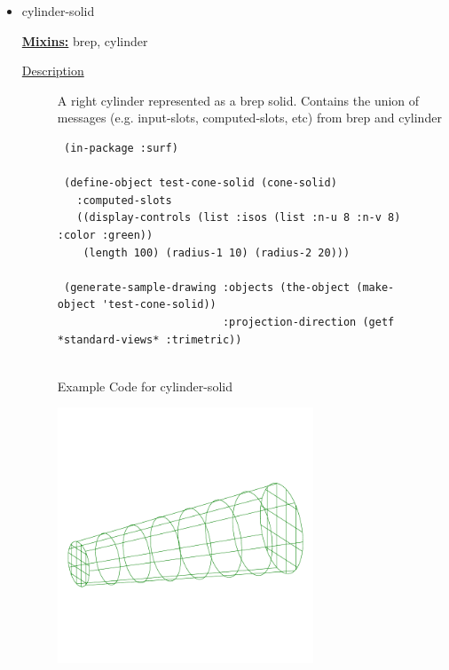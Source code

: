 \documentclass [11pt]{book}
\begin{document}
\begin{itemize}
\item {}cylinder-solid


\textbf{
\underline{Mixins:}} brep, cylinder





\begin{description}

\item [
\underline{Description}]


A right cylinder represented as a brep solid. Contains the union of messages (e.g. input-slots, computed-slots, etc)
from brep and cylinder



\end{description}




\begin{figure}
\begin{lrbox}{\boxedverb}
\begin{minipage}{\linewidth}
{\small

\begin{verbatim}
 (in-package :surf)

 (define-object test-cone-solid (cone-solid)
   :computed-slots
   ((display-controls (list :isos (list :n-u 8 :n-v 8) :color :green))
    (length 100) (radius-1 10) (radius-2 20)))
 
 (generate-sample-drawing :objects (the-object (make-object 'test-cone-solid))
                          :projection-direction (getf *standard-views* :trimetric))


\end{verbatim}}
\end{minipage}
\end{lrbox}
\fbox{\usebox{\boxedverb}}

\caption{Example Code for cylinder-solid}

\label{fig:example-code-cylinder-solid}

\end{figure}

\begin{figure}
\begin{center}
\includegraphics[width=3in,height=3in]{../images/example-cylinder-solid.pdf}
\end{center}


\end{figure}
\end{itemize}
\end{document}

